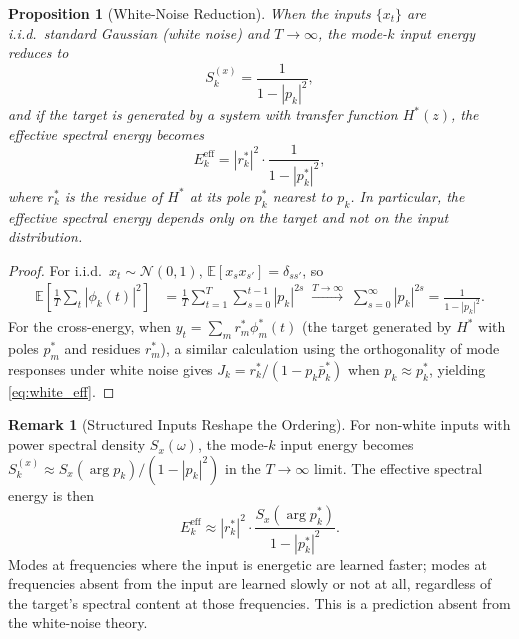 \documentclass[11pt,a4paper]{article}
\newtheorem{proposition}[theorem]{Proposition}
\theoremstyle{definition}
\newtheorem{remark}[theorem]{Remark}
\newcommand{\E}{\mathbb{E}}
\begin{document}
\begin{proposition}[White-Noise Reduction]\label{prop:white_noise}
When the inputs $\{x_t\}$ are i.i.d.\ standard Gaussian (white
noise) and $T \to \infty$, the mode-$k$ input energy reduces to
\begin{equation}\label{eq:white_input}
  S_k^{(x)} = \frac{1}{1 - |p_k|^2},
\end{equation}
and if the target is generated by a system with transfer function
$H^*(z)$, the effective spectral energy becomes
\begin{equation}\label{eq:white_eff}
  E_k^{\mathrm{eff}} = |r_k^*|^2 \cdot
  \frac{1}{1-|p_k^*|^2},
\end{equation}
where $r_k^*$ is the residue of $H^*$ at its pole $p_k^*$
nearest to $p_k$. In particular, the effective spectral energy
depends only on the target and not on the input distribution.
\end{proposition}

\begin{proof}
For i.i.d.\ $x_t \sim \mathcal{N}(0,1)$,
$\E[x_s x_{s'}] = \delta_{ss'}$, so
\begin{align}
  \E\!\left[\frac{1}{T}\sum_t |\phi_k(t)|^2\right]
  &= \frac{1}{T}\sum_{t=1}^T \sum_{s=0}^{t-1} |p_k|^{2s}
  \;\xrightarrow{T\to\infty}\;
  \sum_{s=0}^{\infty} |p_k|^{2s}
  = \frac{1}{1-|p_k|^2}.
\end{align}
For the cross-energy, when $y_t = \sum_m r_m^* \phi_m^*(t)$
(the target generated by $H^*$ with poles $p_m^*$ and residues
$r_m^*$), a similar calculation using the orthogonality of mode
responses under white noise gives
$J_k = r_k^* / (1 - p_k \bar{p}_k^*)$ when $p_k \approx p_k^*$,
yielding \eqref{eq:white_eff}.
\end{proof}

\begin{remark}[Structured Inputs Reshape the Ordering]%
\label{rem:structured}
For non-white inputs with power spectral density $S_x(\omega)$,
the mode-$k$ input energy becomes
$S_k^{(x)} \approx S_x(\arg p_k) / (1-|p_k|^2)$
in the $T\to\infty$ limit. The effective spectral energy is then
\begin{equation}\label{eq:structured_eff}
  E_k^{\mathrm{eff}} \approx
  |r_k^*|^2 \cdot \frac{S_x(\arg p_k^*)}{1-|p_k^*|^2}.
\end{equation}
Modes at frequencies where the input is energetic are learned
faster; modes at frequencies absent from the input are learned
slowly or not at all, regardless of the target's spectral
content at those frequencies. This is a prediction absent from
the white-noise theory.
\end{remark}
\end{document}
